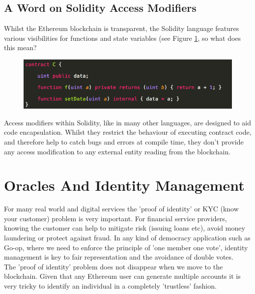 \subsection{A Word on Solidity Access Modifiers}
Whilst the Ethereum blockchain is transparent, the Solidity language features various visibilities for functions and state variables (see Figure \ref{fig:AccessModifiers}, so what does this mean? \\
\begin{figure}
\centering
\includegraphics[width=\textwidth]{Figures/AccessModifiers}
\decoRule
\caption[]{}
\label{fig:AccessModifiers}
\end{figure}
Access modifiers within Solidity, like in many other languages, are designed to aid code encapsulation. Whilst they restrict the behaviour of executing contract code, and therefore help to catch bugs and errors at compile time, they don't provide any access modification to any external entity reading from the blockchain.\\

\section{Oracles And Identity Management}
\label{sec:identity}
For many real world and digital services the 'proof of identity' or KYC (know your customer) problem is very important. For financial service providers, knowing the customer can help to mitigate risk (issuing loans etc), avoid money laundering or protect against fraud. In any kind of democracy application such as Go-op, where we need to enforce the principle of 'one member one vote', identity management is key to fair representation and the avoidance of double votes.\\

The 'proof of identity' problem does not disappear when we move to the blockchain. Given that any Ethereum user can generate multiple accounts it is very tricky to identify an individual in a completely 'trustless' fashion. 


